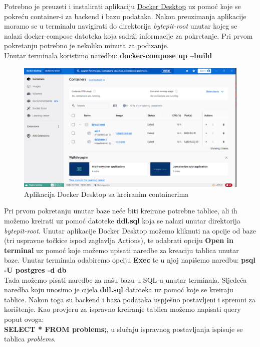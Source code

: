 				\noindent Potrebno je preuzeti i instalirati aplikaciju \href{https://www.docker.com/products/docker-desktop/}{Docker Desktop} uz pomoć koje se pokreću container-i za backend i bazu podataka. Nakon preuzimanja aplikacije moramo se u terminalu navigirati do direktorija \textit{bytepit-root} unutar kojeg se nalazi docker-compose datoteka koja sadrži informacije za pokretanje. Pri prvom pokretanju potrebno je nekoliko minuta za podizanje.\\
				Unutar terminala koristimo naredbu: \textbf{docker-compose up --build}
				\begin{figure}[H]
					\includegraphics[scale=0.45]{slike/docker_desktop.PNG} 
					\centering
					\caption{Aplikacija Docker Desktop sa kreiranim containerima}
					\label{fig:docker_desktop}
				\end{figure}
				\noindent Pri prvom pokretanju unutar baze neće biti kreirane potrebne tablice, ali ih možemo kreirati uz pomoć datoteke \textbf{ddl.sql} koja se nalazi unutar direktorija \textit{bytepit-root}. Unutar aplikacije Docker Desktop možemo kliknuti na opcije od baze (tri uspravne točkice ispod zaglavlja Actions), te odabrati opciju \textbf{Open in terminal} uz pomoć koje možemo upisati naredbe za kreaciju tablica unutar baze. Unutar terminala odabiremo opciju \textbf{Exec} te u njoj napišemo naredbu: \textbf{psql -U postgres -d db}\\
				\eject
				\noindent Tada možemo pisati naredbe za našu bazu u SQL-u unutar terminala. Sljedeća naredba koju unosimo je cijela \textbf{ddl.sql} datoteka uz pomoć koje se kreiraju tablice. Nakon toga su backend i baza podataka uspješno postavljeni i spremni za korištenje. Kao provjeru za ispravno kreiranje tablica možemo napisati query poput ovoga:\\
				\textbf{SELECT * FROM problems;}, u slučaju ispravnog postavljanja ispisuje se tablica \textit{problems}.\\
